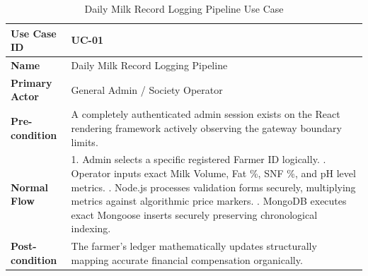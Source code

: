 \documentclass[12pt,a4paper]{report}
\begin{document}
\vspace{0.4cm}
\begin{table}[htbp]
\centering
\begin{tabular}{|p{3cm}|p{11cm}|}
\hline
\textbf{Use Case ID} & UC-01 \\ \hline
\textbf{Name} & Daily Milk Record Logging Pipeline \\ \hline
\textbf{Primary Actor} & General Admin / Society Operator \\ \hline
\textbf{Pre-condition} & A completely authenticated admin session exists on the React rendering framework actively observing the gateway boundary limits. \\ \hline
\textbf{Normal Flow} & 1. Admin selects a specific registered Farmer ID logically. \newline 2. Operator inputs exact Milk Volume, Fat \%, SNF \%, and pH level metrics. \newline 3. Node.js processes validation forms securely, multiplying metrics against algorithmic price markers. \newline 4. MongoDB executes exact Mongoose inserts securely preserving chronological indexing. \\ \hline
\textbf{Post-condition} & The farmer's ledger mathematically updates structurally mapping accurate financial compensation organically. \\ \hline
\end{tabular}
\caption{Daily Milk Record Logging Pipeline Use Case}
\end{table}
\vspace{0.4cm}
\end{document}
